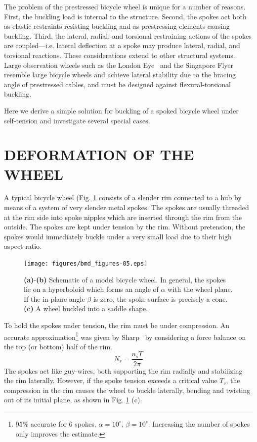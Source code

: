 \documentclass{bmd2016p}
\begin{document}
The problem of the prestressed bicycle wheel is unique for a number of reasons. First, the buckling load is internal to the structure. Second, the spokes act both as elastic restraints resisting buckling and as prestressing elements causing buckling. Third, the lateral, radial, and torsional restraining actions of the spokes are coupled---i.e. lateral deflection at a spoke may produce lateral, radial, and torsional reactions. These considerations extend to other structural systems. Large observation wheels such as the London Eye~\cite{Mann2001a} and the Singapore Flyer~\cite{Allsop2009a} resemble large bicycle wheels and achieve lateral stability due to the bracing angle of prestressed cables, and must be designed against flexural-torsional buckling.

Here we derive a simple solution for buckling of a spoked bicycle wheel under self-tension and investigate several special cases.




\section{DEFORMATION OF THE WHEEL}
A typical bicycle wheel (Fig. \ref{fig:schematic} consists of a slender rim connected to a hub by means of a system of very slender metal spokes. The spokes are usually threaded at the rim side into spoke nipples which are inserted through the rim from the outside. The spokes are kept under tension by the rim. Without pretension, the spokes would immediately buckle under a very small load due to their high aspect ratio.

\begin{figure}[!h]
\centering
\texttt{[image: figures/bmd\_figures-05.eps]}
\caption{\textbf{(a)}-\textbf{(b)} Schematic of a model bicycle wheel. In general, the spokes lie on a hyperboloid which forms an angle of $\alpha$ with the wheel plane. If the in-plane angle $\beta$ is zero, the spoke surface is precisely a cone. \textbf{(c)} A wheel buckled into a saddle shape.}
\label{fig:schematic}
\end{figure}

To hold the spokes under tension, the rim must be under compression. An accurate approximation\footnote{95\% accurate for 6 spokes, $\alpha=10^{\circ}$, $\beta=10^{\circ}$. Increasing the number of spokes only improves the estimate.} was given by Sharp~\cite{Sharp1977a} by considering a force balance on the top (or bottom) half of the rim.
	\begin{equation}\label{eq:TN}
	N_r = \frac{n_sT}{2\pi}
	\end{equation}
The spokes act like guy-wires, both supporting the rim radially and stabilizing the rim laterally. However, if the spoke tension exceeds a critical value $T_c$, the compression in the rim causes the wheel to buckle laterally, bending and twisting out of its initial plane, as shown in Fig. \ref{fig:schematic} (c).
\end{document}
